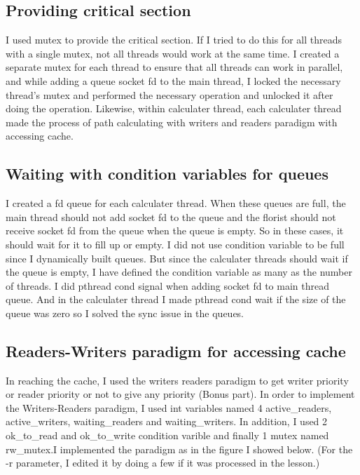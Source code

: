 \documentclass{article}
\begin{document}
\subsection{Providing critical section}
\par{I used mutex to provide the critical section. If I tried to do this for all threads with a single mutex, not all threads would work at the same time. I created a separate mutex for each thread to ensure that all threads can work in parallel, and while adding a queue socket fd to the main thread, I locked the necessary thread's mutex and performed the necessary operation and unlocked it after doing the operation. Likewise, within calculater thread, each calculater thread made the process of path calculating with writers and readers paradigm with accessing cache.}


\subsection{Waiting with condition variables for queues}
\par{I created a fd queue for each calculater thread. When these queues are full, the main thread should not add socket fd to the queue and the florist should not receive socket fd from the queue when the queue is empty. So in these cases, it should wait for it to fill up or empty. I did not use condition variable to be full since I dynamically built queues. But since the calculater threads should wait if the queue is empty, I have defined the condition variable as many as the number of threads. I did pthread cond signal when adding socket fd to main thread queue. And in the calculater thread I made pthread cond wait if the size of the queue was zero so I solved the sync issue in the queues.}


\subsection{Readers-Writers paradigm for accessing cache}
\par{In reaching the cache, I used the writers readers paradigm to get writer priority or reader priority or not to give any priority (Bonus part). In order to implement the Writers-Readers paradigm, I used int variables named 4 active\_readers, active\_writers, waiting\_readers and waiting\_writers. In addition, I used 2 ok\_to\_read and ok\_to\_write condition varible and finally 1 mutex named rw\_mutex.I implemented the paradigm as in the figure I showed below. (For the -r parameter, I edited it by doing a few if it was processed in the lesson.)}
\end{document}
